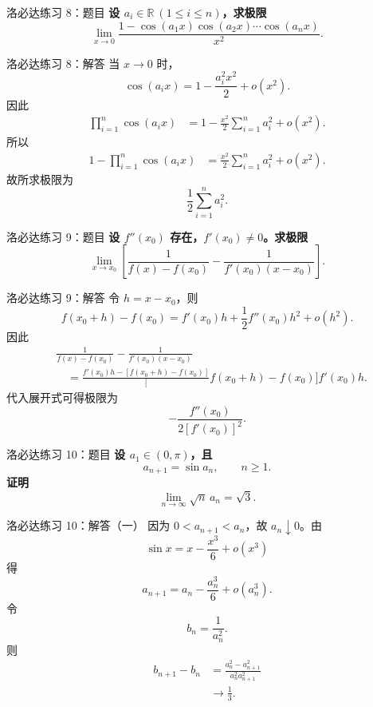 \documentclass[aspectratio=169,11pt]{ctexbeamer}
\newcommand{\R}{\mathbb{R}}
\begin{document}
\begin{frame}{洛必达练习 8：题目}
\small
\textbf{设 $a_i\in\R\ (1\le i\le n)$，求极限}
\[
  \lim_{x\to0}
  \frac{1-\cos(a_1x)\cos(a_2x)\cdots\cos(a_nx)}{x^2}.
\]
\end{frame}

\begin{frame}{洛必达练习 8：解答}
\small
当 $x\to0$ 时，
\[
  \cos(a_ix)=1-\frac{a_i^2x^2}{2}+o(x^2).
\]
因此
\[
\begin{aligned}
\prod_{i=1}^n\cos(a_ix)
&=
1-\frac{x^2}{2}\sum_{i=1}^n a_i^2+o(x^2).
\end{aligned}
\]
所以
\[
\begin{aligned}
1-\prod_{i=1}^n\cos(a_ix)
&=
\frac{x^2}{2}\sum_{i=1}^n a_i^2+o(x^2).
\end{aligned}
\]
故所求极限为
\[
  \frac12\sum_{i=1}^n a_i^2.
\]
\end{frame}

\begin{frame}{洛必达练习 9：题目}
\small
\textbf{设 $f''(x_0)$ 存在，$f'(x_0)\ne0$。求极限}
\[
  \lim_{x\to x_0}
  \left[
  \frac1{f(x)-f(x_0)}
  -
  \frac1{f'(x_0)(x-x_0)}
  \right].
\]
\end{frame}

\begin{frame}{洛必达练习 9：解答}
\small
令 $h=x-x_0$，则
\[
  f(x_0+h)-f(x_0)
  =
  f'(x_0)h+\frac12f''(x_0)h^2+o(h^2).
\]
因此
\[
\begin{aligned}
&\frac1{f(x)-f(x_0)}
-
\frac1{f'(x_0)(x-x_0)}\\
&\quad =
\frac{f'(x_0)h-[f(x_0+h)-f(x_0)]}
[f(x_0+h)-f(x_0)]f'(x_0)h.
\end{aligned}
\]
代入展开式可得极限为
\[
  -\frac{f''(x_0)}{2[f'(x_0)]^2}.
\]
\end{frame}

\begin{frame}{洛必达练习 10：题目}
\small
\textbf{设 $a_1\in(0,\pi)$，且}
\[
  a_{n+1}=\sin a_n,\qquad n\ge1.
\]
\textbf{证明}
\[
  \lim_{n\to\infty}\sqrt n\,a_n=\sqrt3.
\]
\end{frame}

\begin{frame}{洛必达练习 10：解答（一）}
\small
因为 $0<a_{n+1}<a_n$，故 $a_n\downarrow0$。由
\[
  \sin x=x-\frac{x^3}{6}+o(x^3)
\]
得
\[
  a_{n+1}=a_n-\frac{a_n^3}{6}+o(a_n^3).
\]
令
\[
  b_n=\frac1{a_n^2}.
\]
则
\[
\begin{aligned}
b_{n+1}-b_n
&=\frac{a_n^2-a_{n+1}^2}{a_n^2a_{n+1}^2}\\
&\to \frac13.
\end{aligned}
\]
\end{frame}
\end{document}
